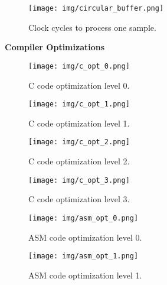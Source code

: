 \documentclass{article}
\begin{document}
\begin{figure}[h]
  \begin{center}
    \texttt{[image: img/circular\_buffer.png]}
    \caption{Clock cycles to process one sample.}
  \end{center}
\end{figure}

\pagebreak
\textbf{Compiler Optimizations}

\begin{figure}[h!]
  \begin{center}
    \texttt{[image: img/c\_opt\_0.png]}
    \caption{C code optimization level 0.}
  \end{center}
\end{figure}

\begin{figure}[h!]
  \begin{center}
    \texttt{[image: img/c\_opt\_1.png]}
    \caption{C code optimization level 1.}
  \end{center}
\end{figure}

\begin{figure}[h!]
  \begin{center}
    \texttt{[image: img/c\_opt\_2.png]}
    \caption{C code optimization level 2.}
  \end{center}
\end{figure}

\begin{figure}[h!]
  \begin{center}
    \texttt{[image: img/c\_opt\_3.png]}
    \caption{C code optimization level 3.}
  \end{center}
\end{figure}

\begin{figure}[h!]
  \begin{center}
    \texttt{[image: img/asm\_opt\_0.png]}
    \caption{ASM code optimization level 0.}
  \end{center}
\end{figure}

\begin{figure}[h!]
  \begin{center}
    \texttt{[image: img/asm\_opt\_1.png]}
    \caption{ASM code optimization level 1.}
  \end{center}
\end{figure}
\end{document}
